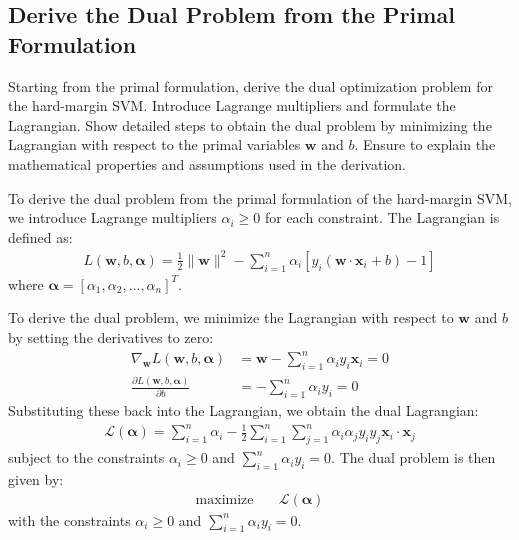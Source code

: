 \subsection{Derive the Dual Problem from the Primal Formulation}
Starting from the primal formulation, derive the dual optimization problem for the hard-margin SVM. Introduce Lagrange multipliers and formulate the Lagrangian. Show detailed steps to obtain the dual problem by minimizing the Lagrangian with respect to the primal variables $\mathbf{w}$ and $b$. Ensure to explain the mathematical properties and assumptions used in the derivation.
\begin{qsolve}
    \begin{qsolve}[]
        To derive the dual problem from the primal formulation of the hard-margin SVM, we introduce Lagrange multipliers $\alpha_i \geq 0$ for each constraint. The Lagrangian is defined as:
        \begin{align*}
            L(\mathbf{w}, b, \boldsymbol{\alpha}) = \frac{1}{2} \|\mathbf{w}\|^2 - \sum_{i=1}^{n} \alpha_i \left[ y_i(\mathbf{w} \cdot \mathbf{x}_i + b) - 1 \right]
        \end{align*}
        where $\boldsymbol{\alpha} = [\alpha_1, \alpha_2, \ldots, \alpha_n]^T$.

        To derive the dual problem, we minimize the Lagrangian with respect to $\mathbf{w}$ and $b$ by setting the derivatives to zero:
        \begin{align*}
            \nabla_{\mathbf{w}} L(\mathbf{w}, b, \boldsymbol{\alpha}) &= \mathbf{w} - \sum_{i=1}^{n} \alpha_i y_i \mathbf{x}_i = 0 \\
            \frac{\partial L(\mathbf{w}, b, \boldsymbol{\alpha})}{\partial b} &= -\sum_{i=1}^{n} \alpha_i y_i = 0
        \end{align*}
        Substituting these back into the Lagrangian, we obtain the dual Lagrangian:
        \begin{align*}
            \mathcal{L}(\boldsymbol{\alpha}) = \sum_{i=1}^{n} \alpha_i - \frac{1}{2} \sum_{i=1}^{n} \sum_{j=1}^{n} \alpha_i \alpha_j y_i y_j \mathbf{x}_i \cdot \mathbf{x}_j
        \end{align*}
        subject to the constraints $\alpha_i \geq 0$ and $\sum_{i=1}^{n} \alpha_i y_i = 0$. The dual problem is then given by:
        \begin{align*}
            \text{maximize} \quad & \mathcal{L}(\boldsymbol{\alpha})
        \end{align*}
        with the constraints $\alpha_i \geq 0$ and $\sum_{i=1}^{n} \alpha_i y_i = 0$.

    \end{qsolve}
\end{qsolve}
